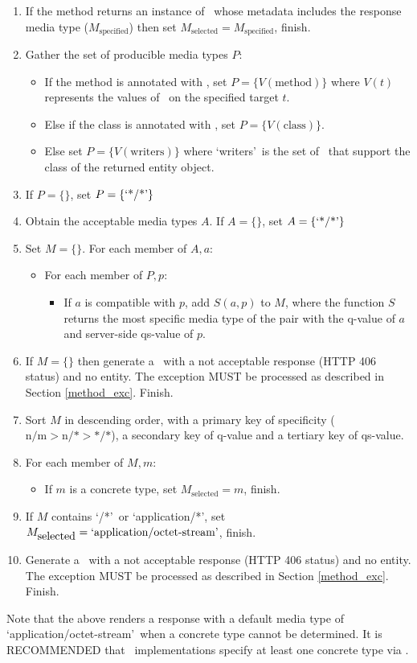 \begin{enumerate}
\item If the method returns an instance of \Response\ whose metadata includes the response media type ($M_{\mbox{specified}}$) then set $M_{\mbox{selected}} = M_{\mbox{specified}}$, finish.
\item Gather the set of producible media types $P$:
\begin{itemize}
\item If the method is annotated with \Produces, set $P = \{ V(\mbox{method}) \}$ where $V(t)$ represents the values of \Produces\ on the specified target $t$.
\item Else if the class is annotated with \Produces, set $P = \{ V(\mbox{class}) \}$.
\item Else set $P = \{ V(\mbox{writers}) \}$ where \lq writers\rq\ is the set of \MsgWrite\ that support the class of the returned entity object.
\end{itemize}

\item If $P = \{\}$, set $P = \{\mbox{\lq*/*\rq}\}$

\item Obtain the acceptable media types $A$. If $A = \{\}$, set $A = \{\mbox{\lq*/*\rq}\}$

\item Set $M=\{\}$. For each member of $A, a$:
\begin{itemize}
\item For each member of $P, p$:
\begin{itemize}
\item If $a$ is compatible with $p$, add $S(a,p)$ to $M$, where the function $S$ returns the most specific media type of the pair with the q-value of $a$ and server-side qs-value of $p$.
\end{itemize}
\end{itemize}

\item If $M = \{\}$ then generate a \WebAppExc\ with a not acceptable response (HTTP 406 status) and no entity. The exception MUST be processed as described in Section \ref{method_exc}. Finish.

\item Sort $M$ in descending order, with a primary key of specificity ($\mbox{n/m} > \mbox{n/*} > \mbox{*/*}$), a secondary key of q-value and a tertiary key of qs-value.

\item For each member of $M, m$:
\begin{itemize}
\item If $m$ is a concrete type, set $M_{\mbox{selected}} = m$, finish.
\end{itemize}

\item If $M$ contains \lq*/*\rq\ or \lq application/*\rq, set $M_{\mbox{selected}} = \mbox{\lq application/octet-stream\rq}$, finish.

\item Generate a \WebAppExc\ with a not acceptable response (HTTP 406 status) and no entity. The exception MUST be processed as described in Section \ref{method_exc}. Finish.
\end{enumerate}

Note that the above renders a response with a default media type of \lq application/octet-stream\rq\ when a concrete type cannot be determined. It is RECOMMENDED that \MsgWrite\ implementations specify at least one concrete type via \Produces.
